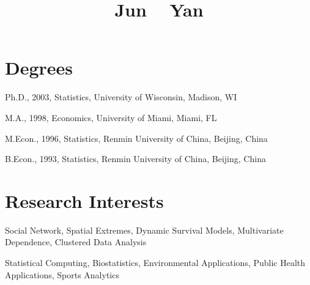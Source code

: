 \documentclass[Statistics]{vita}
\begin{document}
\title{Jun ~ Yan}
\begin{vita}
  \section{Degrees}\label{degrees}
  \begin{description}
  \item Ph.D., 2003, Statistics, University of Wisconsin, Madison, WI
  \item M.A., 1998, Economics, University of Miami, Miami, FL
  \item M.Econ., 1996, Statistics, Renmin University of China, Beijing, China
  \item B.Econ., 1993, Statistics, Renmin University of China, Beijing, China
  \end{description}
  \section{Research Interests}
  \begin{description}
  \item Social Network, Spatial Extremes, Dynamic Survival Models, Multivariate Dependence, Clustered Data Analysis
  \item Statistical Computing, Biostatistics, Environmental Applications, Public Health Applications, Sports Analytics
  \end{description}

\end{vita}
\end{document}
